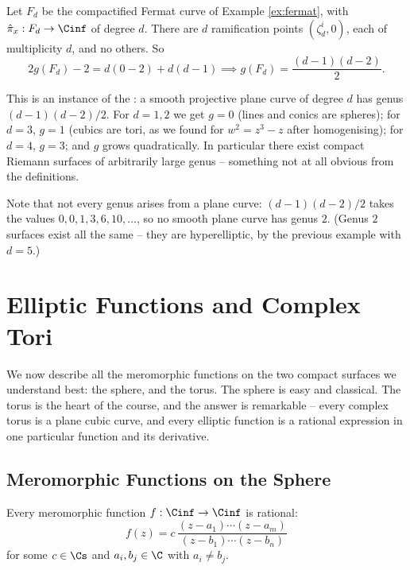 \begin{example}\label{ex:fermatgenus}
	Let $F_d$ be the compactified Fermat curve of Example \ref{ex:fermat}, with
	$\hat\pi_x : F_d \to \Cinf$ of degree $d$. There are $d$ ramification points
	$(\zeta_d^i, 0)$, each of multiplicity $d$, and no others. So
	$$
	2g(F_d) - 2 = d(0-2) + d(d-1) \implies g(F_d) = \frac{(d-1)(d-2)}{2}.
	$$

	This is an instance of the : a smooth projective plane
	curve of degree $d$ has genus $(d-1)(d-2)/2$. For $d = 1, 2$ we get $g = 0$ (lines and
	conics are spheres); for $d = 3$, $g = 1$ (cubics are tori, as we found for
	$w^2 = z^3-z$ after homogenising); for $d = 4$, $g = 3$; and $g$ grows quadratically.
	In particular there exist compact Riemann surfaces of arbitrarily large genus --
	something not at all obvious from the definitions.

	Note that not every genus arises from a plane curve: $(d-1)(d-2)/2$ takes the values
	$0,0,1,3,6,10,\dots$, so no smooth plane curve has genus $2$. (Genus $2$ surfaces exist
	all the same -- they are hyperelliptic, by the previous example with $d = 5$.)
\end{example}

\section{Elliptic Functions and Complex Tori}\label{sec:elliptic}

We now describe all the meromorphic functions on the two compact surfaces we understand
best: the sphere, and the torus. The sphere is easy and classical. The torus is the heart
of the course, and the answer is remarkable -- every complex torus is a plane cubic curve,
and every elliptic function is a rational expression in one particular function and its
derivative.

\subsection{Meromorphic Functions on the Sphere}

\begin{proposition}\label{prop:rational}
	Every meromorphic function $f : \Cinf \to \Cinf$ is rational:
	$$
	f(z) = c\,\frac{(z-a_1)\cdots(z-a_m)}{(z-b_1)\cdots(z-b_n)}
	$$
	for some $c \in \Cs$ and $a_i, b_j \in \C$ with $a_i \neq b_j$.
\end{proposition}

